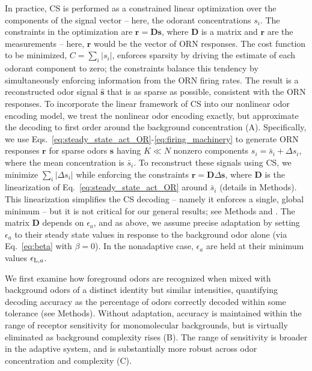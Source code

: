 \documentclass[9pt,lineno]{elife}
\begin{document}
{\color{blue} 
In practice, CS is performed as a constrained linear optimization over the components of the signal vector -- here, the odorant concentrations $s_i$. The constraints in the optimization are $\mathbf r = \mathbf D \mathbf s$, where $\mathbf D$ is a matrix and $\mathbf r$ are the measurements -- here, $\mathbf r$ would be the vector of ORN responses. The cost function to be minimized, $C = \sum_i |s_i|$, enforces sparsity by driving the estimate of each odorant component to zero; the constraints balance this tendency by simultaneously enforcing information from the ORN firing rates. The result is a reconstructed odor signal $\hat {\mathbf s}$ that is as sparse as possible, consistent with the ORN responses.
}
To incorporate the linear framework of CS into our nonlinear odor encoding model, we treat the nonlinear odor encoding exactly, but approximate the decoding to first order around the background concentration (A). Specifically, we use Eqs.~\ref{eq:steady_state_act_OR}-\ref{eq:firing_machinery} to generate ORN responses $\mathbf r$ for sparse odors $\mathbf s$ having $K \ll N$ nonzero components $s_i = \bar{s}_i + \Delta s_i$, where the mean concentration is $\bar{s}_i$. To reconstruct these signals using CS, we minimize $\sum_i |\Delta s_i|$ while enforcing the constraints $\mathbf r = \mathbf D \Delta \mathbf s$, where $\mathbf D$ is the linearization of Eq.~\ref{eq:steady_state_act_OR} around $\bar{s}_i$ (details in Methods). This linearization simplifies the CS decoding -- namely it enforces a single, global minimum  -- but it is not critical for our general results; see Methods and . The matrix $\mathbf D$ depends on $\epsilon_a$, and as above, we assume precise adaptation by setting $\epsilon_a$ to their steady state values in response to the background odor alone (via Eq.~\ref{eq:beta} with $\beta=0$). In the nonadaptive case, $\epsilon_a$ are held at their minimum values $\epsilon_{\textup L, a}$. 

We first examine how foreground odors are recognized when mixed with background odors of a distinct identity but similar intensities, quantifying decoding accuracy as the percentage of odors correctly decoded within some tolerance (see Methods). Without adaptation, accuracy is maintained within the range of receptor sensitivity for monomolecular backgrounds, but is virtually eliminated as background complexity rises (B). The range of sensitivity is broader in the adaptive system, and is substantially more robust across odor concentration and complexity (C). 
\end{document}
